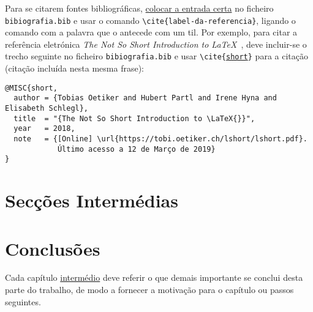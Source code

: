 Para se citarem fontes bibliográficas, \underline{colocar a entrada certa} no ficheiro \texttt{bibiografia.bib} e usar o comando \texttt{\textbackslash{}cite\{label-da-referencia\}}, ligando o comando com a palavra que o antecede com um til. Por exemplo, para citar a referência eletrónica \emph{The Not So Short Introduction to \LaTeX{}}~\cite{short}, deve incluir-se o trecho seguinte no ficheiro \texttt{bibiografia.bib} e usar \texttt{\textbackslash{}cite\{\underline{short}\}} para a citação (citação incluída nesta mesma frase):
%
\begin{verbatim}
@MISC{short,
  author = {Tobias Oetiker and Hubert Partl and Irene Hyna and Elisabeth Schlegl},
  title  = "{The Not So Short Introduction to \LaTeX{}}",
  year   = 2018,
  note   = {[Online] \url{https://tobi.oetiker.ch/lshort/lshort.pdf}. 
            Último acesso a 12 de Março de 2019}
}
\end{verbatim}


\section{Secções Intermédias}
\label{chap2:sec:...}

\section{Conclusões}
\label{chap2:sec:concs}

Cada capítulo \underline{intermédio} deve referir o que demais importante se conclui desta parte do trabalho, de modo a fornecer a motivação para o capítulo ou passos seguintes.